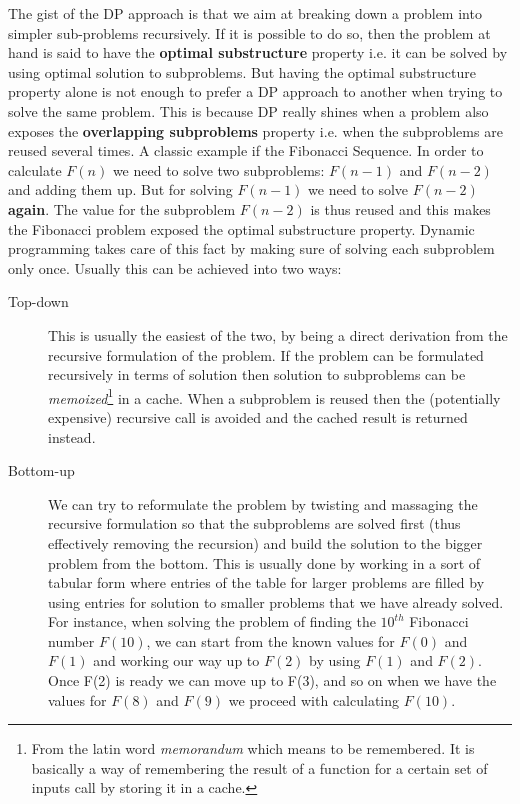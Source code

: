 The gist of the DP approach is that we aim at breaking down a problem into
simpler sub-problems recursively. If it is possible to do so, then the problem
at hand is said to have the \textbf{optimal substructure} property i.e. it can
be solved by using optimal solution to subproblems. But having the optimal
substructure property alone is not enough to prefer a DP approach to another
when trying to solve the same problem. This is because DP really shines when a
problem also exposes the \textbf{overlapping subproblems} property i.e. when the
subproblems are reused several times. A classic example if the
Fibonacci Sequence. In order to calculate $F(n)$ we need to solve two subproblems:
$F(n-1)$ and $F(n-2)$ and adding them up. But for solving $F(n-1)$ we need to
solve $F(n-2)$ \textbf{again}. The value for the subproblem $F(n-2)$ is thus
reused and this makes the Fibonacci problem exposed the optimal substructure
property. 
Dynamic programming takes care of this fact by making sure of solving each
subproblem only once. Usually this can be achieved into two ways:
\begin{description}
    \item [Top-down] This is usually the easiest of the two, by being a direct
    derivation from the recursive formulation of the problem. If the problem can
    be formulated recursively in terms of solution then solution to subproblems
    can be \textit{memoized}\footnote{From the latin word \textit{memorandum}
    which means to be remembered. It is basically a way of remembering the
    result of a function for a certain set of inputs call by storing it in a
    cache.} in a cache. 
    When a subproblem is reused then the
    (potentially expensive) recursive call is avoided and the cached result is
    returned instead. 
    \item [Bottom-up] We can try to reformulate the problem by twisting and
    massaging  the  recursive formulation so that the subproblems are solved
    first (thus effectively removing the recursion) and build the solution to
    the bigger problem from the bottom. This is usually done by working in a
    sort of tabular form where entries of the table for larger problems are
    filled by using  entries for solution to smaller problems that we have
    already solved. For instance, when solving the problem of finding the
    $10^{th}$ Fibonacci number $F(10)$, we can start from the known values for
    $F(0)$ and $F(1)$ and working our way up to $F(2)$  by using $F(1)$ and
    $F(2)$. Once F(2) is ready we can move up to F(3), and so on when we have
    the values for $F(8)$ and $F(9)$ we proceed with calculating $F(10)$.
\end{description}

